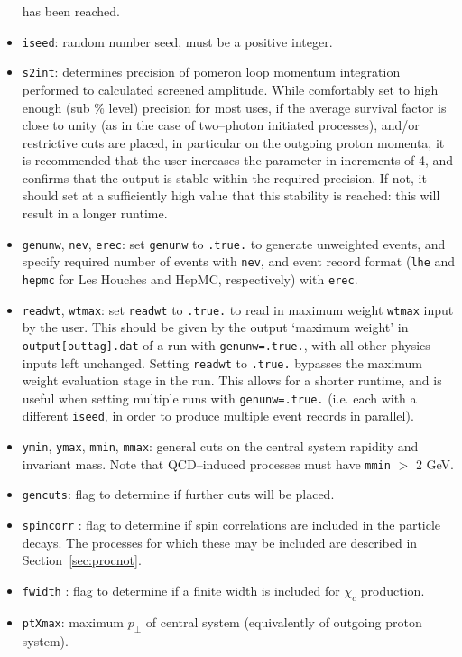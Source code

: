 \documentclass[12pt]{article}
\begin{document}
\begin{itemize}
has been reached.
\item \texttt{iseed}: random number seed, must be a positive integer.
\item \texttt{s2int}: determines precision of pomeron loop momentum integration performed to calculated screened 
amplitude. While comfortably set to high enough (sub \% level) precision for most uses, if the average survival factor
 is close to unity (as in the case of two--photon initiated processes), and/or restrictive cuts are placed, in 
 particular on the outgoing proton momenta, it is recommended that the user increases the parameter in increments of 4,
  and confirms that the output is stable within the required precision. If not, it should set at a sufficiently high 
  value that this stability is reached: this will result in a longer runtime.
\item \texttt{genunw}, \texttt{nev}, \texttt{erec}: set \texttt{genunw} to \texttt{.true.} to generate unweighted events,
 and specify required number of events with \texttt{nev}, and event record format (\texttt{lhe} and 
 \texttt{hepmc} for Les Houches and HepMC, respectively) with \texttt{erec}.
\item \texttt{readwt}, \texttt{wtmax}: set \texttt{readwt} to \texttt{.true.} to read in maximum weight \texttt{wtmax} 
input by the user. This should be given by the output `maximum weight' in  \texttt{output[outtag].dat} of a run with 
\texttt{genunw=.true.}, with all other physics inputs left unchanged. Setting \texttt{readwt} to \texttt{.true.} bypasses 
the maximum weight evaluation stage in the run. This allows for a shorter runtime, and is useful when setting multiple runs 
with \texttt{genunw=.true.} (i.e. each with a different \texttt{iseed}, in order to produce multiple event records in parallel).
\item \texttt{ymin}, \texttt{ymax}, \texttt{mmin}, \texttt{mmax}: general cuts on the central system rapidity and invariant
 mass. Note that QCD--induced processes must have \texttt{mmin} $>$ 2 GeV.
\item \texttt{gencuts}: flag to determine if further cuts will be placed.
\item \texttt{spincorr} : flag to determine if spin correlations are included in the particle decays. The processes for 
which these may be included are described in Section~\ref{sec:procnot}.
\item \texttt{fwidth} : flag to determine if a finite width is included for $\chi_c$ production.
\item \texttt{ptXmax}: maximum $p_\perp$ of central system (equivalently of outgoing proton system).

\end{itemize}
\end{document}
